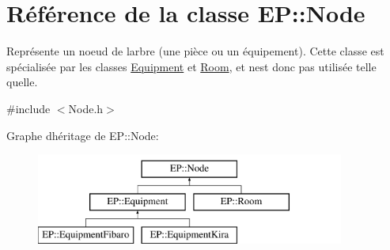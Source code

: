\hypertarget{class_e_p_1_1_node}{}\section{Référence de la classe EP\+:\+:Node}
\label{class_e_p_1_1_node}


Représente un noeud de l\textquotesingle{}arbre (une pièce ou un équipement). Cette classe est spécialisée par les classes \hyperlink{class_e_p_1_1_equipment}{Equipment} et \hyperlink{class_e_p_1_1_room}{Room}, et n\textquotesingle{}est donc pas utilisée telle qu\textquotesingle{}elle.  




{\ttfamily \#include $<$Node.\+h$>$}

Graphe d\textquotesingle{}héritage de EP\+:\+:Node\+:\begin{figure}[H]
\begin{center}
\leavevmode
\includegraphics[height=3.000000cm]{class_e_p_1_1_node}
\end{center}
\end{figure}
